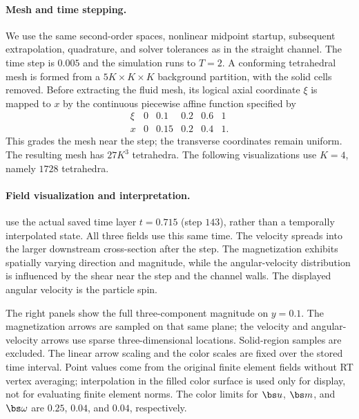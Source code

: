 \paragraph{Mesh and time stepping.}
We use the same second-order spaces, nonlinear midpoint startup,
subsequent extrapolation, quadrature, and solver tolerances as in
the straight channel. The time step is $0.005$ and the simulation
runs to $T=2$.
A conforming tetrahedral mesh is formed from a $5K\times K\times K$
background partition, with the solid cells removed.
Before extracting the fluid mesh, its logical axial coordinate
$\xi$ is mapped to $x$ by the continuous piecewise affine function
specified by
\[
\begin{array}{c|ccccc}
\xi&0&0.1&0.2&0.6&1\\\hline
x&0&0.15&0.2&0.4&1.
\end{array}
\]
This grades the mesh near the step; the transverse coordinates
remain uniform. The resulting mesh has $27K^3$ tetrahedra.
The following visualizations use $K=4$, namely $1728$ tetrahedra.

\paragraph{Field visualization and interpretation.}
 use the actual saved
time layer $t=0.715$ (step $143$), rather than a temporally
interpolated state. All three fields use this same time.
The velocity spreads into the larger downstream cross-section after
the step. The magnetization exhibits spatially varying direction
and magnitude, while the angular-velocity distribution is influenced
by the shear near the step and the channel walls.
The displayed angular velocity is the particle spin.

The right panels show the full three-component magnitude on $y=0.1$.
The magnetization arrows are sampled on that same plane; the velocity
and angular-velocity arrows use sparse three-dimensional locations.
Solid-region samples are excluded. The linear arrow scaling and the
color scales are fixed over the stored time interval.
Point values come from the original finite element fields without
RT vertex averaging; interpolation in the filled color surface is
used only for display, not for evaluating finite element norms.
The color limits for $\bs u$, $\bs m$, and $\bs\omega$ are
$0.25$, $0.04$, and $0.04$, respectively.

